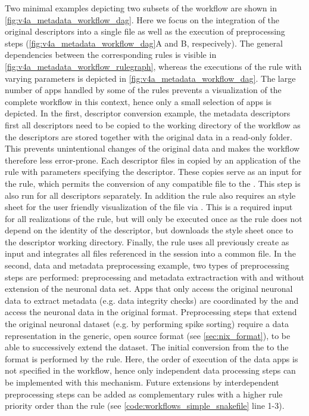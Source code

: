 Two minimal examples depicting two subsets of the workflow are shown in \cref{fig:v4a_metadata_workflow_dag}. Here we focus on the integration of the original  descriptors into a single  file as well as the execution of preprocessing steps (\cref{fig:v4a_metadata_workflow_dag}A and B, respecively). The general  dependencies between the corresponding rules is visible in \cref{fig:v4a_metadata_workflow_rulegraph}, whereas the executions of the rule with varying parameters is depicted in \cref{fig:v4a_metadata_workflow_dag}. The large number of apps handled by some of the rules prevents a visualization of the complete workflow in this context, hence only a small selection of apps is depicted.
In the first, descriptor conversion example, the metadata descriptors first all  descriptors need to be copied to the working directory of the workflow as the descriptors are stored together with the original data in a read-only folder. This prevents unintentional changes of the original data and makes the workflow therefore less error-prone. Each descriptor files in copied by an application of the  rule with parameters specifying the descriptor. These copies serve as an input for the  rule, which permits the conversion of any  compatible  file to the . This step is also run for all descriptors separately. In addition the  rule also requires an  style sheet for the user friendly visualization of the  file via . This is a required input for all realizations of the  rule, but will only be executed once as the  rule does not depend on the identity of the descriptor, but downloads the style sheet once to the descriptor working directory. Finally, the  rule uses all previously create  as input and integrates all  files referenced in the session  into a common  file.
In the second, data and metadata preprocessing example, two types of preprocessing steps are performed: preprocessing and metadata extractraction with and without extension of the neuronal data set. Apps that only access the original neuronal data to extract metadata (e.g. data integrity checks) are coordinated by the  and access the neuronal data in the original  format. Preprocessing steps that extend the original neuronal dataset (e.g. by performing spike sorting) require a data representation in the generic, open source  format (see \cref{sec:nix_format}), to be able to successively extend the dataset. The initial conversion from the  to the  format is performed by the  rule. Here, the order of execution of the data apps is not specified in the workflow, hence only independent data processing steps can be implemented with this mechanism. Future extensions by interdependent preprocessing steps can be added as complementary rules with a higher rule priority order than the  rule (see \cref{code:workflows_simple_snakefile} line 1-3).

